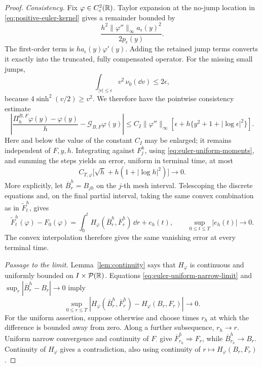 \begin{proof}
\emph{Consistency.}
Fix \(\varphi\in C_c^2(\mathbb R)\).
Taylor expansion at the no-jump location in \eqref{eq:positive-euler-kernel} gives a remainder bounded by
\[
 \frac{h^2\|\varphi''\|_\infty
                      a_\epsilon(y)^2}{2p_\epsilon(y)}.
 \]
The first-order term is \(h a_\epsilon(y)\varphi'(y)\).
Adding the retained jump terms converts it exactly into the truncated, fully compensated operator.
For the missing small jumps,
\[
 \int_{|v|\le\epsilon}v^2\,\nu_0(\dd v)\le2\epsilon,
 \]
because \(4\sinh^2(v/2)\ge v^2\).
We therefore have the pointwise consistency estimate
\begin{equation}
 \left|
 \frac{\Pi_h^{B,F}\varphi(y)-\varphi(y)}h
       -\mathcal G_{B,F}\varphi(y)
 \right|
 \le C_I\|\varphi''\|_\infty
       \left[\epsilon+
              h\{y^2+1+|\log\epsilon|^2\}\right].
 \label{eq:euler-consistency}
\end{equation}
Here and below the value of the constant \(C_I\) may be enlarged; it remains independent of \(F,y,h\).
Integrating against \(F_j^h\), using \eqref{eq:euler-uniform-moments}, and summing the steps yields an error, uniform in terminal time, at most
\begin{equation}
 C_{T,\varphi}\bigl[\sqrt h+h(1+|\log h|^2)\bigr]
   \longrightarrow0.
 \label{eq:euler-total-error}
\end{equation}
More explicitly, let \(\overline B_r^h=B_{jh}\) on the \(j\)-th mesh interval.
Telescoping the discrete equations and, on the final partial interval, taking the same convex combination as in \(\widetilde F_t^h\), gives
\begin{equation}
 \widetilde F_t^h(\varphi)-F_0(\varphi)
  =\int_0^t
       H_\varphi(\overline B_r^h,\overline F_r^h)\,\dd r
       +e_h(t),
 \qquad
 \sup_{0\le t\le T}|e_h(t)|\longrightarrow0 .
 \label{eq:euler-integrated-consistency}
\end{equation}
The convex interpolation therefore gives the same vanishing error at every terminal time.

\emph{Passage to the limit.}
Lemma~\ref{lem:continuity} says that \(H_\varphi\) is continuous and uniformly bounded on \(I\times\mathcal P(\mathbb R)\).
Equations \eqref{eq:euler-uniform-narrow-limit} and \(\sup_r|\overline B_r^h-B_r|\to0\) imply
\begin{equation}
 \sup_{0\le r\le T}
 \left|
 H_\varphi(\overline B_r^h,\overline F_r^h)
       -H_\varphi(B_r,F_r)
 \right|\longrightarrow0.
 \label{eq:euler-nonlinear-limit}
\end{equation}
For the uniform assertion, suppose otherwise and choose times \(r_h\) at which the difference is bounded away from zero.
Along a further subsequence, \(r_h\to r\).
Uniform narrow convergence and continuity of \(F_\cdot\) give \(\overline F_{r_h}^h\Rightarrow F_r\), while \(\overline B_{r_h}^h\to B_r\).
Continuity of \(H_\varphi\) gives a contradiction, also using continuity of \(r\mapsto H_\varphi(B_r,F_r)\).


\end{proof}
